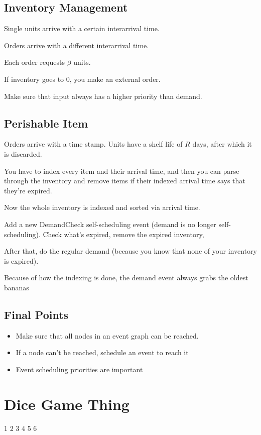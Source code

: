 \documentclass[fleqn]{report}
\begin{document}
\subsection{Inventory Management}
Single units arrive with a certain interarrival time. 

Orders arrive with a different interarrival time. 

Each order requests $\beta$ units.

If inventory goes to 0, you make an external order.

Make sure that input always has a higher priority than demand. 

\subsection{Perishable Item}
Orders arrive with a time stamp. Units have a shelf life of $R$ days, 
after which it is discarded. 

You have to index every item and their arrival time, and then you 
can parse through the inventory and remove items if their indexed arrival time 
says that they're expired. 

Now the whole inventory is indexed and sorted via arrival time. 

Add a new DemandCheck self-scheduling event (demand is no longer self-scheduling). 
Check what's expired, remove the expired inventory, 

After that, do the regular demand (because you know that none 
of your inventory is expired). 

Because of how the indexing is done, the demand event always grabs 
the oldest bananas 

\subsection{Final Points}
\begin{itemize}
    \item 
    Make sure that all nodes in an event graph can be reached. 
    \item 
    If a node can't be reached, schedule an event to reach it 
    \item 
    Event scheduling priorities are important 
\end{itemize}
    
\section{Dice Game Thing}
1 2 3 4 5 6 
\end{document}
